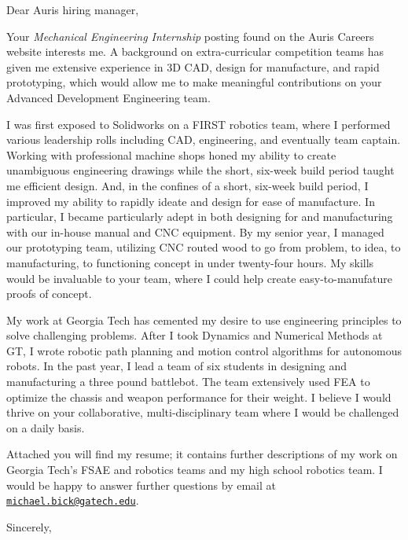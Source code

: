 \documentclass[12pt]{cover_letter}
\date{April 11, 2018}
\begin{document}
  \begin{letter}{}

    \opening{Dear Auris hiring manager,}

    \thispagestyle{fancy}

    Your \textit{Mechanical Engineering Internship} posting found on the Auris Careers website interests me. A background on extra-curricular competition teams has given me extensive experience in 3D CAD, design for manufacture, and rapid prototyping, which would allow me to make meaningful contributions on your Advanced Development Engineering team.

    I was first exposed to Solidworks on a FIRST robotics team, where I performed various leadership rolls including CAD, engineering, and eventually team captain. Working with professional machine shops honed my ability to create unambiguous engineering drawings while the short, six-week build period taught me efficient design. And, in the confines of a short, six-week build period, I improved my ability to rapidly ideate and design for ease of manufacture. In particular, I became particularly adept in both designing for and manufacturing with our in-house manual and CNC equipment. By my senior year, I managed our prototyping team, utilizing CNC routed wood to go from problem, to idea, to manufacturing, to functioning concept in under twenty-four hours. My skills would be invaluable to your team, where I could help create easy-to-manufature proofs of concept.

    My work at Georgia Tech has cemented my desire to use engineering principles to solve challenging problems. After I took Dynamics and Numerical Methods at GT, I wrote robotic path planning and motion control algorithms for autonomous robots. In the past year, I lead a team of six students in designing and manufacturing a three pound battlebot. The team extensively used FEA to optimize the chassis and weapon performance for their weight. I believe I would thrive on your collaborative, multi-disciplinary team where I would be challenged on a daily basis.

    Attached you will find my resume; it contains further descriptions of my work on Georgia Tech's FSAE and robotics teams and my high school robotics team. I would be happy to answer further questions by email at \href{mailto:michael.bick@gatech.edu}{\nolinkurl{michael.bick@gatech.edu}}.

    \closing{Sincerely,}

  \end{letter}
\end{document}
